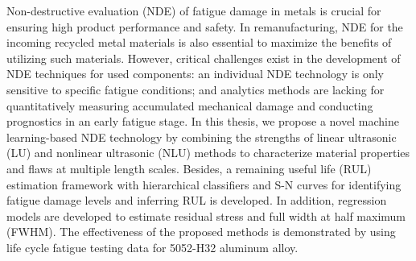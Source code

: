 Non-destructive evaluation (NDE) of fatigue damage in metals is crucial for ensuring high product performance and safety. In remanufacturing, NDE for the incoming recycled metal materials is also essential to maximize the benefits of utilizing such materials. However, critical challenges exist in the development of NDE techniques for used components: an individual NDE technology is only sensitive to specific fatigue conditions; and analytics methods are lacking for quantitatively measuring accumulated mechanical damage and conducting prognostics in an early fatigue stage. In this thesis, we propose a novel machine learning-based NDE technology by combining the strengths of linear ultrasonic (LU) and nonlinear ultrasonic (NLU) methods to characterize material properties and flaws at multiple length scales. Besides, a remaining useful life (RUL) estimation framework with hierarchical classifiers and S-N curves for identifying fatigue damage levels and inferring RUL is developed. In addition, regression models are developed to estimate residual stress and full width at half maximum (FWHM). The effectiveness of the proposed methods is demonstrated by using life cycle fatigue testing data for 5052-H32 aluminum alloy.
